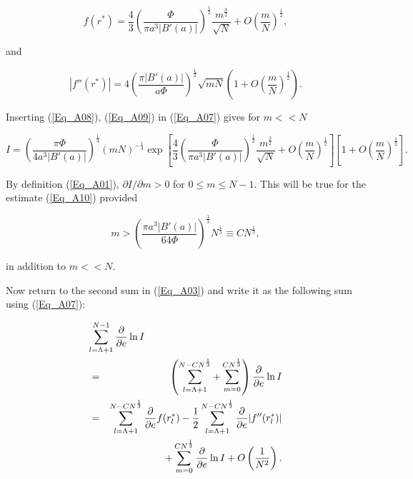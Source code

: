 \documentclass[a4paper,twocolumn,showpacs,preprintnumbers,amsmath,amssymb]{revtex4}
\newcommand{\half}{\frac{1}{2}}
\newcommand{\pdo}[1]{\ensuremath{\frac{\partial }
        {\partial #1 }}}
\begin{document}
\begin{equation}
\label{Eq_A08}
f(r^{*})
  = \frac{4}{3} \left(\frac{\Phi}{\pi a^3 |B'(a)|}\right)^{\half}
    \frac{m^{\frac{3}{2}}}{\sqrt{N}} + O\left(\frac{m}{N}\right)^{\half},
\end{equation}

\noindent
and

\begin{equation}
\label{Eq_A09}
|f''(r^{*})|
  = 4 \left(\frac{\pi|B'(a)|}{a\Phi}\right)^{\half} \sqrt{mN}
    \left(1 + O\left(\frac{m}{N}\right)^{\half}\right).
\end{equation}

\noindent
Inserting (\ref{Eq_A08}), (\ref{Eq_A09}) in (\ref{Eq_A07}) gives for
$m << N$

\begin{widetext}
\begin{equation}
\label{Eq_A10}
I = \left(\frac{\pi \Phi}{4 a^3 |B'(a)|}\right)^{\frac{1}{4}}
    (mN)^{-\frac{1}{4}}
  \exp
  \left[
  \frac{4}{3} \left(\frac{\Phi}{\pi a^3|B'(a)|}\right)^{\half}
  \frac{m^{\frac{3}{2}}}{\sqrt{N}} + O\left(\frac{m}{N}\right)^{\half}
  \right]
  \left[1 + O\left(\frac{m}{N}\right)^{\half}\right]. 
\end{equation}
\end{widetext}

\noindent
By definition (\ref{Eq_A01}), $\partial I / \partial m > 0$ for
$0 \le m \le N-1$. This will be true for the estimate (\ref{Eq_A10})
provided

\begin{equation}
\label{Eq_A11}
m > \left(\frac{\pi a^3 |B'(a)|}{64 \Phi} \right)^{\frac{1}{3}}
  N^{\frac{1}{3}} \equiv CN^{\frac{1}{3}},
\end{equation}

\noindent
in addition to $m << N$.

Now return to the second sum in (\ref{Eq_A03}) and write it as the
following sum using (\ref{Eq_A07}):

\begin{eqnarray}
\nonumber
\lefteqn{\sum^{N-1}_{l=\Lambda+1} \pdo{e} \ln I}\\
\label{Eq_A12}
  &=& \left(\sum^{N-CN^{\frac{1}{3}}}_{l = \Lambda + 1}
      + \sum^{CN^{\frac{1}{3}}}_{m=0}\right) \pdo{e} \ln I\\
\nonumber
  &=& \sum^{N-CN^{\frac{1}{3}}}_{l=\Lambda + 1} \pdo{e} f(r^{*}_l)
      - \half \sum^{N-CN^{\frac{1}{3}}}_{l=\Lambda+1}
      \pdo{e} |f''(r^{*}_l)|\\
\label{Eq_A13}
  & & + \sum^{CN^{\frac{1}{3}}}_{m=0} \pdo{e} \ln I
      + O\left(\frac{1}{N^2}\right).
\end{eqnarray}
\end{document}
